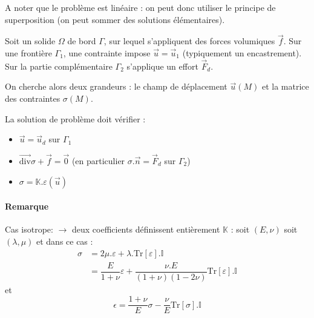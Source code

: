 \documentclass{article}
\begin{document}
A noter que le problème est linéaire : on peut donc utiliser le principe de superposition (on peut sommer des solutions élémentaires).
\bigskip

Soit un solide $\Omega$ de bord $\Gamma$, sur lequel s'appliquent des forces volumiques $\vec{f}$. Sur une frontière $\Gamma_1$, une contrainte impose $\vec{u} = \vec{u}_1$ (typiquement un encastrement). Sur la partie complémentaire $\Gamma_2$ s'applique un effort $\vec{F}_d$.
\bigskip

On cherche alors deux grandeurs : le champ de déplacement $\vec{u}(M)$ et la matrice des contraintes $\sigma(M)$.
\bigskip

La solution de problème doit vérifier :
\begin{itemize}[label=$\star$]
\item $\vec{u}=\vec{u}_d$ sur $\Gamma_1$
\item $\overrightarrow{\text{div}} \sigma + \vec{f} = \vec{0}$ (en particulier $\sigma.\vec{n} = \vec{F}_d$ sur $\Gamma_2$)
\item $\sigma=\mathbb{K}.\varepsilon(\vec{u})$
\end{itemize}

\paragraph{Remarque} Cas isotrope: $\to$ deux coefficients définissent entièrement $\mathbb{K}$ : soit $(E,\nu)$ soit $(\lambda, \mu)$ et dans ce cas :
\begin{align*}
\sigma & = 2\mu.\varepsilon + \lambda.\text{Tr} [\varepsilon]. \mathbb{I}\\
& = \dfrac{E}{1 + \nu}\varepsilon + \dfrac{\nu.E}{(1+\nu)(1-2\nu)}\text{Tr}[\varepsilon] . \mathbb{I}
\end{align*}
et
\[\epsilon = \dfrac{1+\nu}{E}\sigma - \dfrac{\nu}{E}\text{Tr}[\sigma].\mathbb{I}\]
\end{document}
